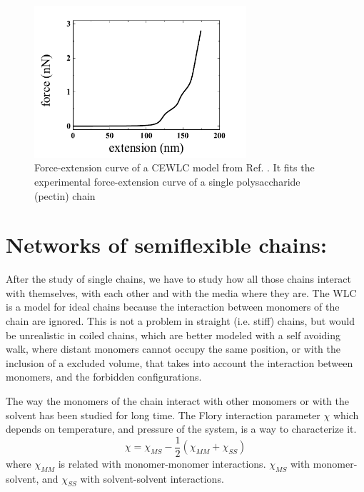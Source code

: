 \begin{figure}[ht]
\begin{center}
\includegraphics[width=0.7\textwidth,height=0.5\textwidth]{Figures/chapter-intro/forceextension_CEWLC.png}%

\caption[Force extension curve: CEWLC]{Force-extension curve of a CEWLC model
from Ref. \citep{schuster_hierarchical_2011}. It fits the experimental
force-extension curve of a single polysaccharide (pectin) chain \citep{haverkamp_model_2007} }
\label{fig:force_extension_CEWLC}
\end{center}
\end{figure}

\section{Networks of semiflexible chains:}
After the study of single chains, we have to study how all those chains interact
with themselves, with each other and with the media where they are.
The WLC is a model for ideal chains because the interaction between
monomers of the chain are ignored. This is not a problem in straight
(i.e. stiff) chains, but would be unrealistic in coiled chains, which are better
modeled with a self avoiding walk, where distant monomers cannot occupy the
same position, or with the inclusion of a excluded volume, that takes into
account the interaction between monomers, and the forbidden configurations.

The way the monomers of the chain interact with other monomers or with the
solvent has been studied for long time. The Flory interaction parameter $\chi$
which depends on temperature, and pressure of the system, is a way to
characterize it.
\begin{equation}\label{FloryInteraction}
\chi=\chi_{MS} - \frac{1}{2}(\chi_{MM} + \chi_{SS})
\end{equation}
where  $\chi_{MM}$ is related with monomer-monomer interactions. $\chi_{MS}$
with monomer-solvent, and $\chi_{SS}$ with solvent-solvent
interactions.

